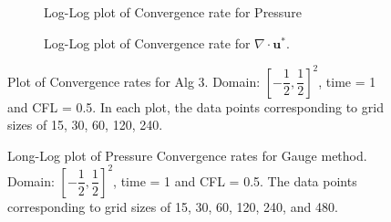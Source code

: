 \begin{figure}[H]
	\centering
	\begin{subfigure}[t]{4.5in}
		\centering
		\caption{Log-Log plot of Convergence rate for Pressure}\label{fig:6.19a}		
	\end{subfigure}
	\quad
	\begin{subfigure}[t]{4.5in}
		\centering
		\caption{Log-Log plot of Convergence rate for $\nabla \cdot \textbf{u}^*$. }\label{fig:6.19b}
	\end{subfigure}
	\caption{Plot of Convergence rates for Alg 3. Domain: $[-\dfrac{1}{2}, \dfrac{1}{2}]^2$, time = 1 and CFL = 0.5. In each plot, the data points corresponding to grid sizes of 15, 30, 60, 120, 240.}\label{fig:6.16}
\end{figure}

\begin{figure}[H]
	\centering
	\caption{Long-Log plot of Pressure Convergence rates for Gauge method. Domain: $[-\dfrac{1}{2},\dfrac{1}{2}]^2$, time = 1 and CFL = 0.5. The data points corresponding to grid sizes of 15, 30, 60, 120, 240, and 480.}\label{fig:6.16}
\end{figure}

